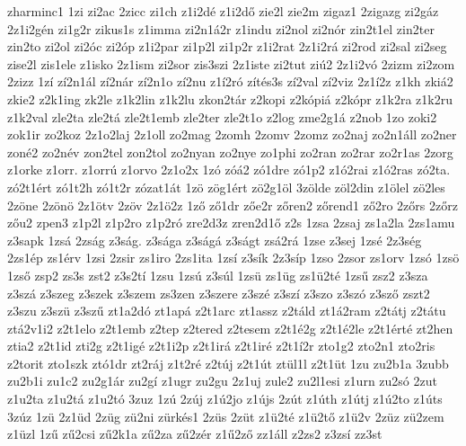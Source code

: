 {zharminc1
1zi
zi2ac
2zicc
zi1ch
z1i2dé
z1i2dő
zie2l
zie2m
zigaz1
2zigazg
zi2gáz
2z1i2gén
zi1g2r
zikus1s
z1imma
zi2n1á2r
z1indu
zi2nol
zi2nór
zin2t1el
zin2ter
zin2to
zi2ol
zi2óc
zi2óp
z1i2par
zi1p2l
zi1p2r
z1i2rat
2z1i2rá
zi2rod
zi2sal
zi2seg
zise2l
zis1ele
z1isko
2z1ism
zi2sor
zis3szi
2z1iste
zi2tut
ziú2
2z1i2vó
2zizm
zi2zom
2zizz
1zí
zí2n1ál
zí2nár
zí2n1o
zí2nu
z1í2ró
zítés3s
zí2val
zí2viz
2z1í2z
z1kh
zkiá2
zkie2
z2k1ing
zk2le
z1k2lin
z1k2lu
zkon2tár
z2kopi
z2kópiá
z2kópr
z1k2ra
z1k2ru
z1k2val
zle2ta
zle2tá
zle2t1emb
zle2ter
zle2t1o
z2log
zme2g1á
z2nob
1zo
zoki2
zok1ir
zo2koz
2z1o2laj
2z1oll
zo2mag
2zomh
2zomv
2zomz
zo2naj
zo2n1áll
zo2ner
zoné2
zo2név
zon2tel
zon2tol
zo2nyan
zo2nye
zo1phi
zo2ran
zo2rar
zo2r1as
2zorg
z1orke
z1orr.
z1orrú
z1orvo
2z1o2x
1zó
zóá2
zó1dre
zó1p2
z1ó2rai
z1ó2ras
zó2ta.
zó2t1ért
zó1t2h
zó1t2r
zózat1át
1zö
zög1ért
zö2g1öl
3zölde
zöl2din
z1ölel
zö2les
2zöne
2zönö
2z1ötv
2zöv
2z1ö2z
1ző
ző1dr
zőe2r
zőren2
zőrend1
ző2ro
2zőrs
2zőrz
zőu2
zpen3
z1p2l
z1p2ro
z1p2ró
zre2d3z
zren2d1ő
z2s
1zsa
2zsaj
zs1a2la
2zs1amu
z3sapk
1zsá
2zság
z3ság.
z3sága
z3ságá
z3ságt
zsá2rá
1zse
z3sej
1zsé
2z3ség
2zs1ép
zs1érv
1zsi
2zsir
zs1iro
2zs1ita
1zsí
z3sík
2z3síp
1zso
2zsor
zs1orv
1zsó
1zsö
1zső
zsp2
zs3s
zst2
z3s2tí
1zsu
1zsú
z3súl
1zsü
zs1üg
zs1ü2té
1zsű
zsz2
z3sza
z3szá
z3szeg
z3szek
z3szem
zs3zen
z3szere
z3szé
z3szí
z3szo
z3szó
z3sző
zszt2
z3szu
z3szü
z3szű
zt1a2dó
zt1apá
z2t1arc
zt1assz
z2táld
zt1á2ram
z2tátj
z2tátu
ztá2v1i2
z2t1elo
z2t1emb
z2tep
z2tered
z2tesem
z2t1é2g
z2t1é2le
z2t1érté
zt2hen
ztia2
z2t1id
zti2g
z2t1igé
z2t1i2p
z2t1irá
z2t1iré
z2t1í2r
zto1g2
zto2n1
zto2ris
z2torit
zto1szk
ztó1dr
zt2ráj
z1t2ré
z2túj
z2t1út
ztül1l
z2t1üt
1zu
zu2b1a
3zubb
zu2b1i
zu1c2
zu2g1ár
zu2gí
z1ugr
zu2gu
2z1uj
zule2
zu2l1esi
z1urn
zu2só
2zut
z1u2ta
z1u2tá
z1u2tó
3zuz
1zú
2zúj
z1ú2jo
z1újs
2zút
z1úth
z1útj
z1ú2to
z1úts
3zúz
1zü
2z1üd
2züg
zü2ni
zürkés1
2züs
2züt
z1ü2té
z1ü2tő
z1ü2v
2züz
zü2zem
z1üzl
1zű
zű2csi
zű2k1a
zű2za
zű2zér
z1ű2ző
zz1áll
z2zs2
z3zsí
zz3st
}
